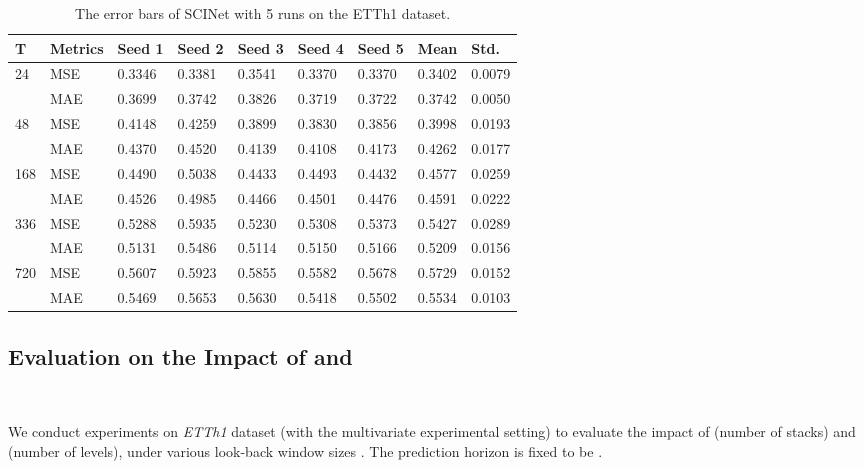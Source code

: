 \documentclass{article}
\begin{document}
\begin{table}[!ht]
    \centering
    \caption{The error bars of SCINet with 5 runs on the ETTh1 dataset.}
    \begin{tabular}{l|l|l|l|l|l|l|l|l}
    \hline
        T & Metrics & Seed 1 & Seed 2 & Seed 3 & Seed 4 & Seed 5 & Mean & Std. \\ \hline
        24 & MSE & 0.3346 & 0.3381 & 0.3541 & 0.3370 & 0.3370 & 0.3402 & 0.0079 \\ 
        ~ & MAE & 0.3699 & 0.3742 & 0.3826 & 0.3719 & 0.3722 & 0.3742 & 0.0050 \\ \hline
        48 & MSE & 0.4148 & 0.4259 & 0.3899 & 0.3830 & 0.3856 & 0.3998 & 0.0193 \\ 
        ~ & MAE & 0.4370 & 0.4520 & 0.4139 & 0.4108 & 0.4173 & 0.4262 & 0.0177 \\ \hline
        168 & MSE & 0.4490 & 0.5038 & 0.4433 & 0.4493 & 0.4432 & 0.4577 & 0.0259 \\ 
        ~ & MAE & 0.4526 & 0.4985 & 0.4466 & 0.4501 & 0.4476 & 0.4591 & 0.0222 \\ \hline
        336 & MSE & 0.5288 & 0.5935 & 0.5230 & 0.5308 & 0.5373 & 0.5427 & 0.0289 \\ 
        ~ & MAE & 0.5131 & 0.5486 & 0.5114 & 0.5150 & 0.5166 & 0.5209 & 0.0156 \\ \hline
        720 & MSE & 0.5607 & 0.5923 & 0.5855 & 0.5582 & 0.5678 & 0.5729 & 0.0152 \\ 
        ~ & MAE & 0.5469 & 0.5653 & 0.5630 & 0.5418 & 0.5502 & 0.5534 & 0.0103 \\ \hline
    \end{tabular}
    \label{tab:supp_bar}
\end{table}













\subsection{Evaluation on the Impact of  and }~\label{appendix:KL}

We conduct experiments on \emph{ETTh1} dataset (with the multivariate experimental setting) to evaluate the impact of  (number of stacks) and  (number of levels), under various look-back window sizes . The prediction horizon is fixed to be .  
\end{document}
